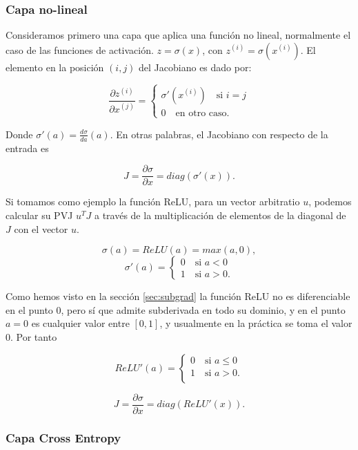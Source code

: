 \subsubsection{Capa no-lineal}



Consideramos primero una capa que aplica una función no lineal, normalmente el caso de las funciones de activación. $z=\sigma(x)$, con $z^{(i)} = \sigma(x^{(i)})$. El elemento en la posición $(i,j)$ del Jacobiano es dado por:

$$ \frac{\partial z^{(i)}}{\partial x^{(j)}} =  \left\{\begin{matrix}

\sigma'(x^{(i)}) \quad \textrm{si } i=j  \\
0 \quad \textrm{en otro caso.}
\end{matrix}\right .
$$

Donde $\sigma'(a) = \frac{d\sigma}{da}(a)$. En otras palabras, el Jacobiano con respecto de la entrada es 

$$J=\frac{\partial \sigma}{\partial x}= diag(\sigma'(x)).$$

Si tomamos como ejemplo la función ReLU, para un vector arbitratio $u$, podemos calcular su PVJ $u^TJ$ a través de la multiplicación  de elementos de la diagonal de $J$ con el vector $u$. 


$$\sigma(a) = ReLU(a)= max(a,0),$$
$$\sigma'(a)=
\left\{\begin{matrix}

0 \quad \textrm{si } a<0  \\
1 \quad \textrm{si } a>0.
\end{matrix}\right.
$$

Como hemos visto en la sección \ref{sec:subgrad} la función ReLU no es diferenciable en el punto 0, pero sí que admite subderivada en todo su dominio, y en el punto $a=0$ es cualquier valor entre $[0,1]$, y usualmente en la práctica se toma el valor 0. Por tanto

$$ReLU'(a)= \left\{\begin{matrix}

0 \quad \textrm{si } a\leq0  \\
1 \quad \textrm{si } a>0 \textrm{.} \\
\end{matrix} \right.$$

$$J=\frac{\partial \sigma}{\partial x}= diag(ReLU'(x)).$$


\subsubsection{Capa Cross Entropy}

